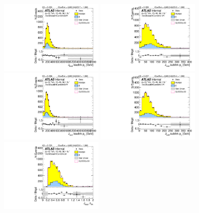 \begin{figure}[htbp!]
\begin{center}
\includegraphics[angle=270, width=0.45\textwidth]{./figures/boosted/Sideband/b77_ThreeTag_Sideband_leadHCand_trk0_Pt.pdf}
\includegraphics[angle=270, width=0.45\textwidth]{./figures/boosted/Sideband/b77_ThreeTag_Sideband_leadHCand_trk1_Pt.pdf}\\
\includegraphics[angle=270, width=0.45\textwidth]{./figures/boosted/Sideband/b77_ThreeTag_Sideband_sublHCand_trk0_Pt.pdf}
\includegraphics[angle=270, width=0.45\textwidth]{./figures/boosted/Sideband/b77_ThreeTag_Sideband_sublHCand_trk1_Pt.pdf}\\
\includegraphics[angle=270, width=0.45\textwidth]{./figures/boosted/Sideband/b77_ThreeTag_Sideband_leadHCand_trk_dr.pdf}

\end{center}
\end{figure}
